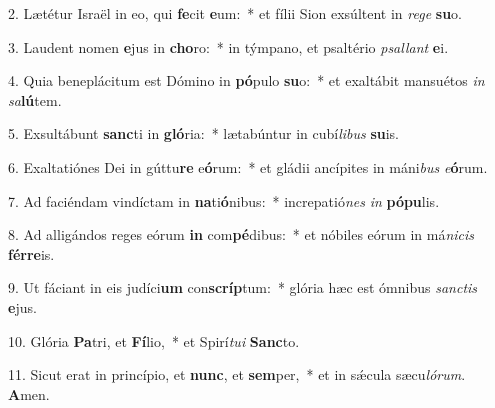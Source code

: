2. Lætétur Israël in eo, qui \textbf{fe}cit \textbf{e}um:~*  et fílii Sion exsúltent in \textit{re}\textit{ge} \textbf{su}o.\

3. Laudent nomen \textbf{e}jus in \textbf{cho}ro:~*  in týmpano, et psaltério \textit{psal}\textit{lant} \textbf{e}i.\

4. Quia beneplácitum est Dómino in \textbf{pó}pulo \textbf{su}o:~*  et exaltábit mansuétos \textit{in} \textit{sa}\textbf{lú}tem.\

5. Exsultábunt \textbf{sanc}ti in \textbf{gló}ria:~*  lætabúntur in cubí\textit{li}\textit{bus} \textbf{su}is.\

6. Exaltatiónes Dei in gúttu\textbf{re} e\textbf{ó}rum:~*  et gládii ancípites in máni\textit{bus} \textit{e}\textbf{ó}rum.\

7. Ad faciéndam vindíctam in \textbf{na}ti\textbf{ó}nibus:~*  increpatió\textit{nes} \textit{in} \textbf{pó}\textbf{pu}lis.\

8. Ad alligándos reges eórum \textbf{in} com\textbf{pé}dibus:~*  et nóbiles eórum in má\textit{ni}\textit{cis} \textbf{fér}\textbf{re}is.\

9. Ut fáciant in eis judíci\textbf{um} con\textbf{scríp}tum:~*  glória hæc est ómnibus \textit{sanc}\textit{tis} \textbf{e}jus.\

10. Glória \textbf{Pa}tri, et \textbf{Fí}lio,~*  et Spirí\textit{tu}\textit{i} \textbf{Sanc}to.\

11. Sicut erat in princípio, et \textbf{nunc}, et \textbf{sem}per,~*  et in sǽcula sæcu\textit{ló}\textit{rum}. \textbf{A}men.\

